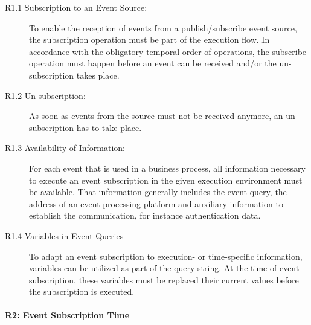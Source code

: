\begin{description}
	\item[R1.1 Subscription to an Event Source:]
	To enable the reception of events from a publish/subscribe event source, the subscription operation must be part of the execution flow. 
	In accordance with the obligatory temporal order of operations, the subscribe operation must happen before an event can be received and/or the un-subscription takes place.
	\item[R1.2 Un-subscription:]
	As soon as events from the source must not be received anymore, an un-subscription has to take place.
	\item[R1.3 Availability of Information:]
	For each event that is used in a business process, all information necessary to execute an event subscription in the given execution environment must be available.
	That information generally includes the event query, the address of an event processing platform and auxiliary information to establish the communication, for instance authentication data.
	\item[R1.4 Variables in Event Queries] 
	To adapt an event subscription to execution- or time-specific information, variables can be utilized as part of the query string.
	At the time of event subscription, these variables must be replaced their current values before the subscription is executed.
	
\end{description}

\paragraph{R2: Event Subscription Time}

